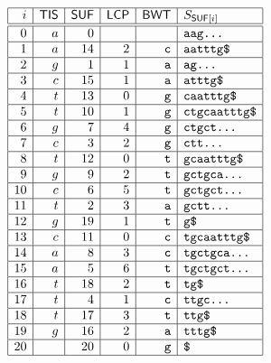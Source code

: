 \documentclass[12pt]{article}
\newcommand{\TIS}[0]{\mathsf{TIS}}
\newcommand{\SUF}[0]{\mathsf{SUF}}
\newcommand{\LCP}[0]{\mathsf{LCP}}
\newcommand{\BWT}[0]{\mathsf{BWT}}
\begin{document}
\[
 \begin{array}[t]{*{5}{|r}|l|}\hline
 i &\TIS &\SUF &\LCP &\BWT &S_{\SUF[i]} \\\hline\hline
 0 &a &0 &       &           &\texttt{aag...}
 \\\hline
 1 &a &14 &2 &\texttt{c} &\texttt{aatttg\symbol{36}}
 \\\hline
 2 &g &1 &1 &\texttt{a} &\texttt{ag...}
 \\\hline
 3 &c &15 &1 &\texttt{a} &\texttt{atttg\symbol{36}}
 \\\hline
 4 &t &13 &0 &\texttt{g} &\texttt{caatttg\symbol{36}}
 \\\hline
 5 &t &10 &1 &\texttt{g} &\texttt{ctgcaatttg\symbol{36}}
 \\\hline
 6 &g &7 &4 &\texttt{g} &\texttt{ctgct...}
 \\\hline
 7 &c &3 &2 &\texttt{g} &\texttt{ctt...}
 \\\hline
 8 &t &12 &0 &\texttt{t} &\texttt{gcaatttg\symbol{36}}
 \\\hline
 9 &g &9 &2 &\texttt{t} &\texttt{gctgca...}
 \\\hline
 10 &c &6 &5 &\texttt{t} &\texttt{gctgct...}
 \\\hline
 11 &t &2 &3 &\texttt{a} &\texttt{gctt...}
 \\\hline
 12 &g &19 &1 &\texttt{t} &\texttt{g\symbol{36}}
 \\\hline
 13 &c &11 &0 &\texttt{c} &\texttt{tgcaatttg\symbol{36}}
 \\\hline
 14 &a &8 &3 &\texttt{c} &\texttt{tgctgca...}
 \\\hline
 15 &a &5 &6 &\texttt{t} &\texttt{tgctgct...}
 \\\hline
 16 &t &18 &2 &\texttt{t} &\texttt{tg\symbol{36}}
 \\\hline
 17 &t &4 &1 &\texttt{c} &\texttt{ttgc...}
 \\\hline
 18 &t &17 &3 &\texttt{t} &\texttt{ttg\symbol{36}}
 \\\hline
 19 &g &16 &2 &\texttt{a} &\texttt{tttg\symbol{36}}
 \\\hline
 20 &  &20 &0 &\texttt{g} &\texttt{\symbol{36}}
 \\\hline
 \end{array}
\]
\end{document}
